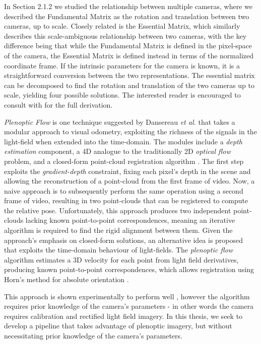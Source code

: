 In Section 2.1.2 we studied the relationship between multiple cameras, where we described the Fundamental Matrix as the rotation and translation between two cameras, up to scale. Closely related is the Essential Matrix, which similarly describes this scale-ambiguous relationship between two cameras, with the key difference being that while the Fundamental Matrix is defined in the pixel-space of the camera, the Essential Matrix is defined instead in terms of the normalized coordinate frame. If the intrinsic parameters for the camera is known, it is a straightforward conversion between the two representations. The essential matrix can be decomposed to find the rotation and translation of the two cameras up to scale, yielding four possible solutions. The interested reader is encouraged to consult with \cite{zisserman2004multiview} for the full derivation.

\textit{Plenoptic Flow} is one technique suggested by Dansereau \textit{et al.} \cite{dansereau2011plenopticflow} that takes a modular approach to visual odometry, exploiting the richness of the signals in the light-field when extended into the time-domain. The modules include a \textit{depth estimation} component, a 4D analogue to the traditionally 2D \textit{optical flow} problem, and a closed-form point-cloud registration algorithm \cite{horn1987absorientation}. The first step exploits the \textit{gradient-depth} constraint, fixing each pixel's depth in the scene and allowing the reconstruction of a point-cloud from the first frame of video. Now, a naive approach is to subsequently perform the same operation using a second frame of video, resulting in two point-clouds that can be registered to compute the relative pose. Unfortunately, this approach produces two independent point-clouds lacking known point-to-point correspondences, meaning an iterative algorithm is required to find the rigid alignment between them. Given the approach's emphasis on closed-form solutions, an alternative idea is proposed that exploits the time-domain behaviour of light-fields. The \textit{plenoptic flow} algorithm estimates a 3D velocity for each point from light field derivatives, producing known point-to-point correspondences, which allows registration using Horn's method for absolute orientation \cite{horn1987absorientation}.

This approach is shown experimentally to perform well \cite{dong2013plenoptic}, however the algorithm requires prior knowledge of the camera's parameters - in other words the camera requires calibration and rectified light field imagery. In this thesis, we seek to develop a pipeline that takes advantage of plenoptic imagery, but without necessitating prior knowledge of the camera's parameters. 

